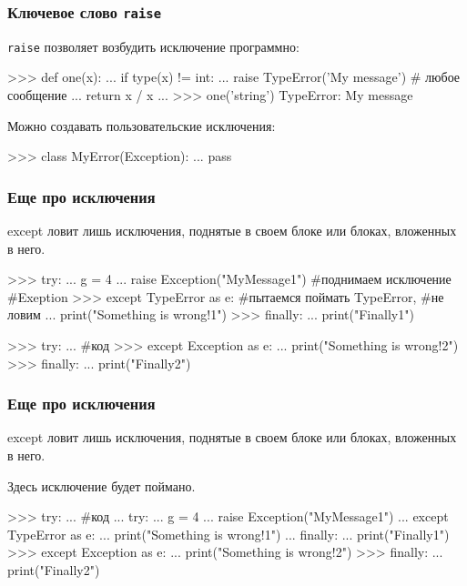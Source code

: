 \documentclass[fleqn, xcolor=x11names]{beamer}
\begin{document}
\begin{frame}[fragile]\frametitle{Ключевое слово \texttt{raise}}
\texttt{raise} позволяет возбудить исключение программно:

\begin{pcode}
>>> def one(x):
...    if type(x) != int:
...        raise TypeError('My message') # любое сообщение
...    return x / x
...
>>> one('string')
TypeError: My message
\end{pcode}

\hfill

Можно создавать пользовательские исключения:
\begin{pcode}
>>> class MyError(Exception):
...    pass
\end{pcode}
\end{frame}

\begin{frame}[fragile]\frametitle{Еще про исключения}

except ловит лишь исключения, поднятые в своем блоке или блоках, вложенных в него.

\begin{pcode}
>>> try:
...     g = 4
...     raise Exception("MyMessage1") #поднимаем исключение
                                      #Exeption
>>> except TypeError as e: #пытаемся поймать TypeError,
                           #не ловим
...     print("Something is wrong!1") 
>>> finally:
...     print("Finally1")

>>> try:
...     #код
>>> except Exception as e:
...     print("Something is wrong!2")
>>> finally:
...     print("Finally2")

\end{pcode}
\end{frame}

\begin{frame}[fragile]\frametitle{Еще про исключения}

except ловит лишь исключения, поднятые в своем блоке или блоках, вложенных в него.

\begin{pcode}

Здесь исключение будет поймано.

>>> try:
...     #код
...     try:
...         g = 4
...         raise Exception("MyMessage1") 
...     except TypeError as e:
...         print("Something is wrong!1") 
...     finally:
...         print("Finally1")
>>> except Exception as e:
...     print("Something is wrong!2")
>>> finally:
...     print("Finally2")

\end{pcode}
\end{frame}
\end{document}
